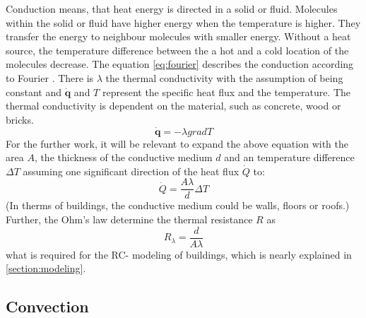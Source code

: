     Conduction means, that heat energy is directed in a solid or fluid. Molecules within the solid or fluid have higher energy when the temperature is higher. They transfer the energy to neighbour molecules with smaller energy. Without a heat source, the temperature difference between the a hot and a cold location of the molecules decrease.\cite{Kuchling.2007}
    \newline The equation \ref{eq:fourier} describes the conduction according to Fourier \cite{.2013}. There is $\lambda$ the thermal conductivity with the assumption of being constant and $\dot{\textbf{q}}$ and $T$ represent the specific heat flux and the temperature. The thermal conductivity is dependent on the material, such as concrete, wood or bricks. 
    \begin{equation}
    \label{eq:fourier}
        \dot{\textbf{q}} = - \lambda grad T
    \end{equation}
    For the further work, it will be relevant to expand the above equation with the area $A$, the thickness of the conductive medium $d$ and an temperature difference $\Delta T$ assuming one significant direction of the heat flux $\dot{Q}$ to:
    \begin{equation}
    \label{eq:conduction}
        \dot{Q} = \frac{A\lambda}{d} \Delta T
    \end{equation}
    (In therms of buildings, the conductive medium could be walls, floors or roofs.)
    \newline
    Further, the Ohm's law 
    \cite{Kuchling.2007} 
    determine the thermal resistance $R$ as
    \begin{equation}
    \label{eq:r_lambda}
        R_\lambda = \frac{d}{A\lambda}
    \end{equation}
    what is required for the RC- modeling of buildings, which is nearly explained in \ref{section:modeling}.

\subsection{Convection}
\label{subsection:convection}

